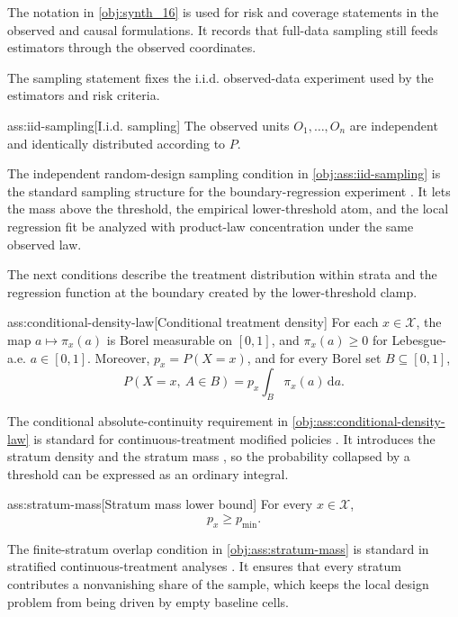 The notation in \cref{obj:synth_16} is used for risk and coverage statements in the observed and causal formulations. It records that full-data sampling still feeds estimators through the observed coordinates.

The sampling statement fixes the i.i.d. observed-data experiment used by the estimators and risk criteria.

\begin{assumptionv}{ass:iid-sampling}[I.i.d. sampling]
The observed units \(O_1,\ldots,O_n\) are independent and identically distributed according to \(P\).
\end{assumptionv}

The independent random-design sampling condition in \cref{obj:ass:iid-sampling} is the standard sampling structure for the boundary-regression experiment \citep{Gaiffas2005DegenerateDesign}. It lets the mass above the threshold, the empirical lower-threshold atom, and the local regression fit be analyzed with product-law concentration under the same observed law.

The next conditions describe the treatment distribution within strata and the regression function at the boundary created by the lower-threshold clamp.

\begin{assumptionv}{ass:conditional-density-law}[Conditional treatment density]
For each \(x\in\mathcal X\), the map \(a\mapsto \pi_x(a)\) is Borel measurable on \([0,1]\), and \(\pi_x(a)\ge 0\) for Lebesgue-a.e. \(a\in[0,1]\). Moreover, \(p_x=P(X=x)\), and for every Borel set \(B\subseteq[0,1]\),
\[
P(X=x,\ A\in B)=p_x\int_B \pi_x(a)\,\mathrm da .
\]
\end{assumptionv}

The conditional absolute-continuity requirement in \cref{obj:ass:conditional-density-law} is standard for continuous-treatment modified policies \citep{DiazWilliamsHoffmanSchenck2023}. It introduces the stratum density  and the stratum mass , so the probability collapsed by a threshold can be expressed as an ordinary integral.

\begin{assumptionv}{ass:stratum-mass}[Stratum mass lower bound]
For every \(x\in\mathcal X\),
\[
p_x\geq p_{\min}.
\]
\end{assumptionv}

The finite-stratum overlap condition in \cref{obj:ass:stratum-mass} is standard in stratified continuous-treatment analyses \citep{DiazWilliamsHoffmanSchenck2023}. It ensures that every stratum contributes a nonvanishing share of the sample, which keeps the local design problem from being driven by empty baseline cells.

